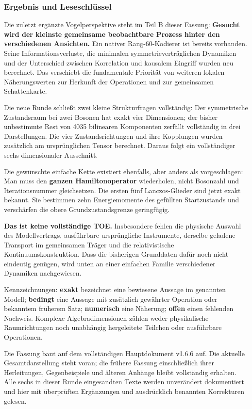 \subsubsection{Ergebnis und
Leseschlüssel}\label{ergebnis-und-leseschluxfcssel-1}

Die zuletzt ergänzte Vogelperspektive steht im Teil B dieser Fassung:
\textbf{Gesucht wird der kleinste gemeinsame beobachtbare Prozess hinter
den verschiedenen Ansichten.} Ein nativer Rang-60-Kodierer ist bereits
vorhanden. Seine Informationsverluste, die minimalen
symmetrieverträglichen Dynamiken und der Unterschied zwischen
Korrelation und kausalem Eingriff wurden neu berechnet. Das verschiebt
die fundamentale Priorität von weiteren lokalen Näherungswerten zur
Herkunft der Operationen und zur gemeinsamen Schattenkarte.

Die neue Runde schließt zwei kleine Strukturfragen vollständig: Der
symmetrische Zustandsraum bei zwei Bosonen hat exakt vier Dimensionen;
der bisher unbestimmte Rest von 4035 bilinearen Komponenten zerfällt
vollständig in drei Darstellungen. Die vier Zustandsrichtungen und ihre
Kopplungen wurden zusätzlich am ursprünglichen Tensor berechnet. Daraus
folgt ein vollständiger sechs-dimensionaler Ausschnitt.

Die gewünschte einfache Kette existiert ebenfalls, aber anders als
vorgeschlagen: Man muss den \textbf{ganzen Hamiltonoperator}
wiederholen, nicht Bosonzahl und Iterationsnummer gleichsetzen. Die
ersten fünf Lanczos-Glieder sind jetzt exakt bekannt. Sie bestimmen zehn
Energiemomente des gefüllten Startzustands und verschärfen die obere
Grundzustandsgrenze geringfügig.

\textbf{Das ist keine vollständige TOE.} Insbesondere fehlen die
physische Auswahl des Modellvertrags, ausführbare ursprüngliche
Instrumente, derselbe geladene Transport im gemeinsamen Träger und die
relativistische Kontinuumskonstruktion. Dass die bisherigen Grunddaten
dafür noch nicht eindeutig genügen, wird unten an einer einfachen
Familie verschiedener Dynamiken nachgewiesen.

Kennzeichnungen: \textbf{exakt} bezeichnet eine bewiesene Aussage im
genannten Modell; \textbf{bedingt} eine Aussage mit zusätzlich gewährter
Operation oder bekanntem früherem Satz; \textbf{numerisch} eine
Näherung; \textbf{offen} einen fehlenden Nachweis. Komplexe
Algebradimensionen zählen weder physikalische Raumrichtungen noch
unabhängig hergeleitete Teilchen oder ausführbare Operationen.

Die Fassung baut auf dem vollständigen Hauptdokument v1.6.6 auf. Die
aktuelle Gesamtdarstellung steht voran; die frühere Fassung
einschließlich ihrer Herleitungen, Gegenbeispiele und älteren Anhänge
bleibt vollständig erhalten. Alle sechs in dieser Runde eingesandten
Texte werden unverändert dokumentiert und hier mit überprüften
Ergänzungen und ausdrücklich benannten Korrekturen gelesen.

